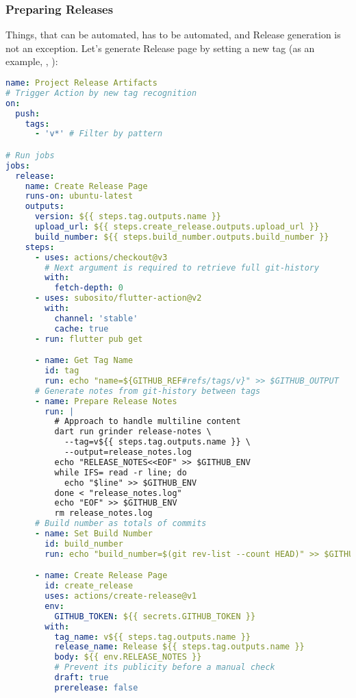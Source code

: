 \subsubsection{Preparing Releases}

Things, that can be automated, has to be automated, and Release generation is not an exception. Let's generate Release
page by setting a new tag (as an example, , ):

\begin{lstlisting}[language=yaml]
name: Project Release Artifacts
# Trigger Action by new tag recognition
on:
  push:
    tags:
      - 'v*' # Filter by pattern

# Run jobs
jobs:
  release:
    name: Create Release Page
    runs-on: ubuntu-latest
    outputs:
      version: ${{ steps.tag.outputs.name }}
      upload_url: ${{ steps.create_release.outputs.upload_url }}
      build_number: ${{ steps.build_number.outputs.build_number }}
    steps:
      - uses: actions/checkout@v3
        # Next argument is required to retrieve full git-history
        with:
          fetch-depth: 0
      - uses: subosito/flutter-action@v2
        with:
          channel: 'stable'
          cache: true
      - run: flutter pub get

      - name: Get Tag Name
        id: tag
        run: echo "name=${GITHUB_REF#refs/tags/v}" >> $GITHUB_OUTPUT
      # Generate notes from git-history between tags
      - name: Prepare Release Notes
        run: |
          # Approach to handle multiline content 
          dart run grinder release-notes \
            --tag=v${{ steps.tag.outputs.name }} \
            --output=release_notes.log
          echo "RELEASE_NOTES<<EOF" >> $GITHUB_ENV
          while IFS= read -r line; do
            echo "$line" >> $GITHUB_ENV
          done < "release_notes.log"
          echo "EOF" >> $GITHUB_ENV
          rm release_notes.log
      # Build number as totals of commits
      - name: Set Build Number
        id: build_number
        run: echo "build_number=$(git rev-list --count HEAD)" >> $GITHUB_OUTPUT

      - name: Create Release Page
        id: create_release
        uses: actions/create-release@v1
        env:
          GITHUB_TOKEN: ${{ secrets.GITHUB_TOKEN }}
        with:
          tag_name: v${{ steps.tag.outputs.name }}
          release_name: Release ${{ steps.tag.outputs.name }}
          body: ${{ env.RELEASE_NOTES }}
          # Prevent its publicity before a manual check
          draft: true
          prerelease: false
\end{lstlisting}


